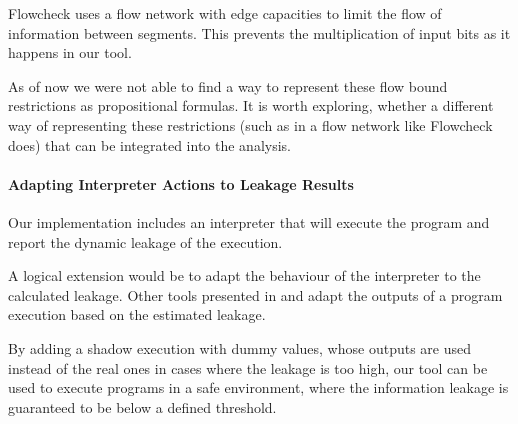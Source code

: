 Flowcheck uses a flow network with edge capacities to limit the flow of information between segments. This prevents the multiplication of input bits as it happens in our tool.

As of now we were not able to find a way to represent these flow bound restrictions as propositional formulas. It is worth exploring, whether a different way of representing these restrictions (such as in a flow network like Flowcheck does) that can be integrated into the analysis.

\paragraph{Adapting Interpreter Actions to Leakage Results}
Our implementation includes an interpreter that will execute the program and report the dynamic leakage of the execution.

A logical extension would be to adapt the behaviour of the interpreter to the calculated leakage. Other tools presented in \cite{devriese10} and \cite{austin17} adapt the outputs of a program execution based on the estimated leakage.

By adding a shadow execution with dummy values, whose outputs are used instead of the real ones in cases where the leakage is too high, our tool can be used to execute programs in a safe environment, where the information leakage is guaranteed to be below a defined threshold. 